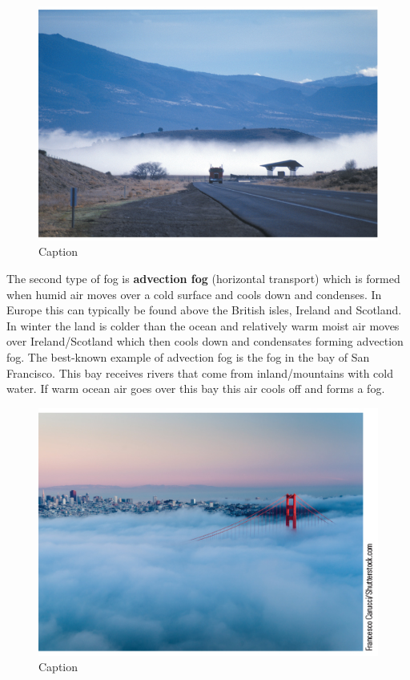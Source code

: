 \documentclass[12pt,oneside]{book}
\begin{document}
\begin{figure}

{\centering \includegraphics[width=0.8\linewidth]{figures/Figure242} 

}

\caption{Caption}\label{fig:Fog2}
\end{figure}

The second type of fog is \textbf{advection fog} (horizontal transport)
which is formed when humid air moves over a cold surface and cools down
and condenses. In Europe this can typically be found above the British
isles, Ireland and Scotland. In winter the land is colder than the ocean
and relatively warm moist air moves over Ireland/Scotland which then
cools down and condensates forming advection fog. The best-known example
of advection fog is the fog in the bay of San Francisco. This bay
receives rivers that come from inland/mountains with cold water. If warm
ocean air goes over this bay this air cools off and forms a fog.

\begin{figure}

{\centering \includegraphics[width=0.8\linewidth]{figures/Figure243} 

}

\caption{Caption}\label{fig:Fog3}
\end{figure}
\end{document}
